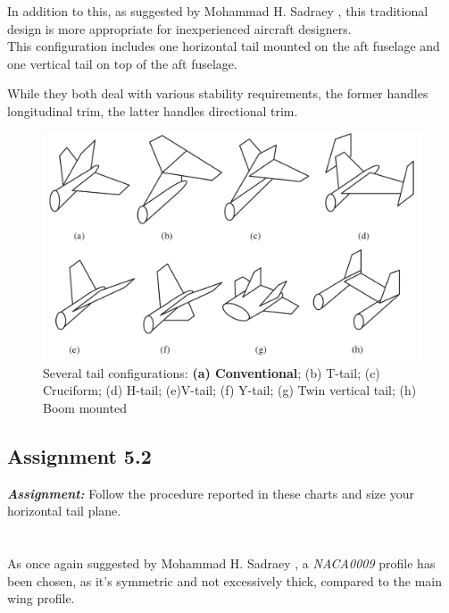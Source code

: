 \documentclass{article}
\begin{document}
In addition to this, as suggested by Mohammad H. Sadraey \autocite{Sadraey_Mohammad}, this traditional design is more appropriate
for inexperienced aircraft designers. \\ 

This configuration includes one horizontal tail mounted on the
aft fuselage and one vertical tail on top of the aft fuselage.

While they both deal with various stability requirements, the former handles longitudinal trim, 
the latter handles directional trim. \\ 


\begin{figure}[h!]
    \centering
    \includegraphics[width=\textwidth]{Sources/Plots_and_Pictures/tail_config.png}
    \caption{Several tail configurations: \textbf{(a) Conventional}; (b) T-tail; (c) Cruciform; (d) H-tail;
    (e)V-tail; (f) Y-tail; (g) Twin vertical tail; (h) Boom mounted \autocite{Sadraey_Mohammad}}
    \label{tail_config}
\end{figure}

\clearpage

\subsection{Assignment 5.2\label{Assignment_5.2}}

\textbf{\textit{Assignment:}} Follow the procedure reported in these charts
 and size your horizontal tail plane. \\ \\ \\ 

As once again suggested by Mohammad H. Sadraey \autocite{Sadraey_Mohammad}, a \textit{NACA0009} profile 
has been chosen, as it's symmetric and not excessively thick, compared to the main wing profile. \\ 
\end{document}
